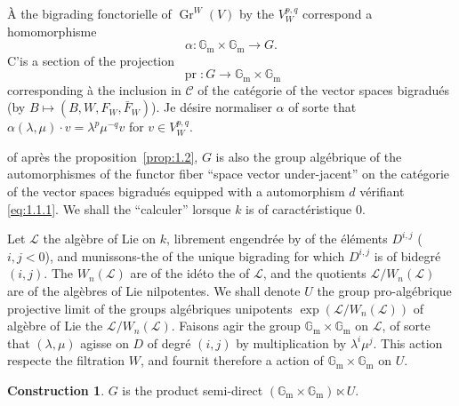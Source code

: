\documentclass[12pt,a4paper]{article}
\theoremstyle{plain}
\theoremstyle{definition}
\newtheorem{construction}[lemme]{Construction}
\DeclareMathOperator{\Gr}{Gr}
\DeclareMathOperator{\pr}{pr}
\newcommand{\Gm}{\mathbb{G}_\mathrm{m}}
\begin{document}
\`{A} the bigrading fonctorielle of $\Gr^W(V)$ by the $V_W^{p,q}$ correspond a
homomorphisme
\begin{equation*}
\alpha : \Gm \times \Gm \longrightarrow G.
\end{equation*}
C'is a section of the projection
\begin{equation*}
\pr : G \to \Gm \times \Gm
\end{equation*}
corresponding \`{a} the inclusion in $\mathscr{C}$ of the cat\'{e}gorie of the vector spaces
bigradu\'{e}s (by $B \mapsto (B, W, F_W, \bar{F}_W)$). Je d\'{e}sire normaliser $\alpha$ of sorte
that $\alpha(\lambda, \mu) \cdot v = \lambda^p \mu^{-q} v$ for $v \in V_W^{p,q}$.

of apr\`{e}s the proposition~\ref{prop:1.2}, $G$ is also the group alg\'{e}brique of the automorphismes of the functor fiber ``space vector under-jacent'' on the cat\'{e}gorie of the
vector spaces bigradu\'{e}s equipped with a automorphism $d$ v\'{e}rifiant \eqref{eq:1.1.1}.
We shall the ``calculer'' lorsque $k$ is of caract\'{e}ristique $0$.

Let $\mathcal{L}$ the alg\`{e}bre of Lie on $k$, librement engendr\'{e}e by of the \'{e}l\'{e}ments
$D^{i,j}$ ($i, j < 0$), and munissons-the of the unique bigrading for which
$D^{i,j}$ is of bidegr\'{e} $(i, j)$. The $W_n(\mathcal{L})$ are of the id\'{e}to the of $\mathcal{L}$, and the quotients $\mathcal{L}/W_n(\mathcal{L})$ are of the alg\`{e}bres of Lie nilpotentes. We shall denote $U$ the
group pro-alg\'{e}brique projective limit of the groups alg\'{e}briques unipotents
$\exp(\mathcal{L}/W_n(\mathcal{L}))$ of alg\`{e}bre of Lie the $\mathcal{L}/W_n(\mathcal{L})$. Faisons agir the group $\Gm \times \Gm$
on $\mathcal{L}$, of sorte that $(\lambda, \mu)$ agisse on $D$ of degr\'{e} $(i, j)$ by multiplication
by $\lambda^i \mu^j$. This action respecte the filtration $W$, and fournit therefore a action
of $\Gm \times \Gm$ on $U$.

\begin{construction}\label{constr:1.6}
$G$ is the product semi-direct $(\Gm \times \Gm) \ltimes U$.
\end{construction}
\end{document}
